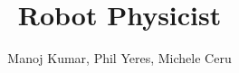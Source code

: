 \documentclass[10pt,journal,compsoc]{IEEEtran}
\begin{document}
%
\title{Robot Physicist}
%
%
%
%

\author{Manoj Kumar, Phil Yeres, Michele Ceru}
\end{document}
